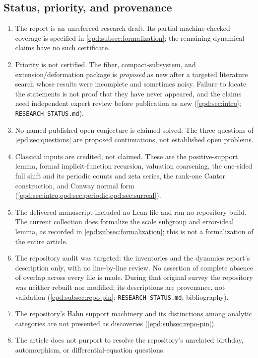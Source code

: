 \documentclass[11pt,a4paper]{article}
\numberwithin{equation}{section}
\theoremstyle{plain}
\theoremstyle{definition}
\theoremstyle{remark}
\begin{document}
\subsection*{Status, priority, and provenance}
\begin{enumerate}[label=\textbf{S\arabic*.},leftmargin=2.8em]
\item The report is an unrefereed research draft. Its partial machine-checked
coverage is specified in \cref{epd:subsec:formalization}; the remaining
dynamical claims have no such certificate.
\item Priority is not certified. The fiber, compact-subsystem, and
extension/deformation package is \emph{proposed} as new after a targeted
literature search whose results were incomplete and sometimes noisy.
Failure to locate the statements is not proof that they have never
appeared, and the claims need independent expert review before
publication as new (\cref{epd:sec:intro}; \texttt{RESEARCH\_STATUS.md}).
\item No named published open conjecture is claimed solved. The three
questions of \cref{epd:sec:questions} are proposed continuations, not
established open problems.
\item Classical inputs are credited, not claimed. These are the
positive-support lemma, formal implicit-function recursion, valuation
coarsening, the one-sided full shift and its periodic counts and zeta
series, the rank-one Cantor construction, and Conway normal form
(\cref{epd:sec:intro,epd:sec:periodic,epd:sec:surreal}).
\item The delivered manuscript included no Lean file and ran no repository
build. The current collection does formalize the scale subgroup and
error-ideal lemma, as recorded in \cref{epd:subsec:formalization};
this is not a formalization of the entire article.
\item The repository audit was targeted: the inventories and the dynamics
report's description only, with no line-by-line review. No assertion of
complete absence of overlap across every file is made. During that original survey the repository was
neither rebuilt nor modified; its descriptions are provenance,
not validation (\cref{epd:subsec:repo-pin}; \texttt{RESEARCH\_STATUS.md};
bibliography).
\item The repository's Hahn support machinery and its distinctions among
analytic categories are not presented as discoveries
(\cref{epd:subsec:repo-pin}).
\item The article does not purport to resolve the repository's unrelated
birthday, automorphism, or differential-equation questions.
\end{enumerate}
\end{document}
